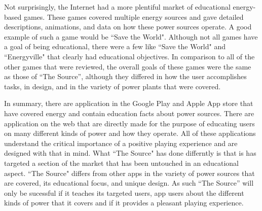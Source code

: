 \documentclass[msc,oneside]{ubcthesis}%
\begin{document}
  Not surprisingly, the Internet had a more plentiful market of educational energy-based games. These games covered multiple energy sources and gave detailed descriptions, animations, and data on how these power sources operate. A good example of such a game would be ``Save the World"\cite{SavetheWorld}.  Although not all games have a goal of being educational, there were a few like ``Save the World"\cite{SavetheWorld} and ``Energyville" \cite{Energyville} that clearly had educational objectives. In comparison to all of the other games that were reviewed, the overall goals of these games were the same as those of “The Source”, although they differed in how the user accomplishes tasks, in design, and in the variety of power plants that were covered.

  In summary, there are application in the Google Play and Apple App store that have covered energy and contain education facts about power sources. There are application on the web that are directly made for the purpose of educating users on many different kinds of power and how they operate. All of these applications understand the critical importance of a positive playing experience and are designed with that in mind. What ``The Source" has done differntly is that is has targeted a section of the market that has been untouched in an educational aspect. ``The Source" differs from other apps in the variety of power sources that are covered, its educational focus, and unique design. As such ``The Source'' will only be sucessful if it teaches its targeted users, app users about the different kinds of power that it covers and if it provides a pleasant playing experience.  

\end{document}
